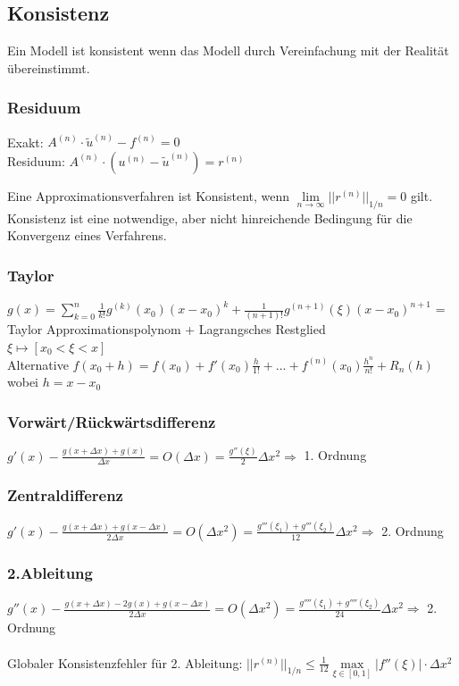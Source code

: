 \subsection{Konsistenz}
Ein Modell ist konsistent wenn das Modell durch Vereinfachung mit der Realität übereinstimmt.

\subsubsection{Residuum}
Exakt: $A^{(n)}\cdot \tilde{u}^{(n)}-f^{(n)}=0$\\
Residuum: $A^{(n)}\cdot (u^{(n)}-\tilde{u}^{(n)})=r^{(n)}$

Eine Approximationsverfahren ist Konsistent, wenn $\boxed{\lim\limits_{n\rightarrow \infty}||r^{(n)}||_{1/n}=0}$ gilt.\\

Konsistenz ist eine notwendige, aber nicht hinreichende Bedingung für die Konvergenz eines Verfahrens.

\subsubsection{Taylor}
$g(x)= \sum\limits_{k=0}^n\frac{1}{k!} g^{(k)}(x_0)(x-x_0)^k +
\frac{1}{(n+1)!}g^{(n+1)}(\xi)(x-x_0)^{n+1}$ = Taylor
Approximationspolynom  + Lagrangsches Restglied\\
$\xi \longmapsto [x_0 < \xi < x]$\\

Alternative
$ f(x_0+h)=f(x_0)+f'(x_0)\frac{h}{1!}+...+f^{(n)}(x_0)\frac{h^n}{n!}+R_n(h) $ wobei $ h = x - x_0 $




\subsubsection{Vorwärt/Rückwärtsdifferenz}
$g'(x) - \frac{g(x+\Delta x) + g(x)}{\Delta x}= O(\Delta x) = 
\frac{g''(\xi)}{2}\Delta x^2 \Rightarrow$  1. Ordnung


\subsubsection{Zentraldifferenz}
$g'(x) - \frac{g(x+\Delta x) + g(x-\Delta x)}{2\Delta x}= O(\Delta x^2) = 
\frac{g'''(\xi_1) + g'''(\xi_2)}{12}\Delta x^2 \Rightarrow$ 2. Ordnung



\subsubsection{2.Ableitung}
$g''(x) - \frac{g(x+\Delta x) -2 g(x)+ g(x-\Delta x)}{2\Delta x}= O(\Delta x^2) =
\frac{g''''(\xi_1) + g''''(\xi_2)}{24}\Delta x^2 \Rightarrow$ 2. Ordnung\\
\\
Globaler Konsistenzfehler für 2. Ableitung: $||r^{(n)}||_{1/n}\leq \frac 1{12}\max\limits_{\xi\in[0,1]}|f''(\xi)|\cdot \Delta x^2$

